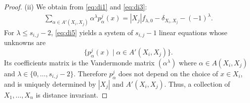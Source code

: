 \documentclass[10pt,a4paper]{amsart}
\begin{document}
\begin{proof}
    (ii) We obtain from \eqref{eq:di1} and \eqref{eq:di3}:   
    \begin{align}\label{eq:di5}
        \sum_{\alpha\in A'(X_i,X_j)}\alpha^\lambda p_{\alpha}^j(x)=|X_j|f_{\lambda,0}-\delta_{X_i,X_j}-(-1)^\lambda.
    \end{align}
    For $\lambda\leq s_{i,j}-2$, \eqref{eq:di5} yields a system of $s_{i,j}-1$ linear equations whose unknowns are
    \[
    \{p_{\alpha}^j(x) \mid \alpha\in A'(X_i,X_j)\}. 
    \]
    Its coefficients matrix is 
 the Vandermonde matrix $(\alpha^\lambda)$ where $\alpha\in A(X_i,X_j)$ and $\lambda\in\{0,\ldots,s_{i,j}-2\}$. 
 Therefore $p_{\alpha}^j$ does not depend on the choice of $x\in X_i$, and is uniquely determined by $|X_j|$ and $A'(X_i,X_j)$.
 Thus, a collection of $X_1,\ldots,X_n$ is distance invariant. 
\end{proof}
\end{document}
